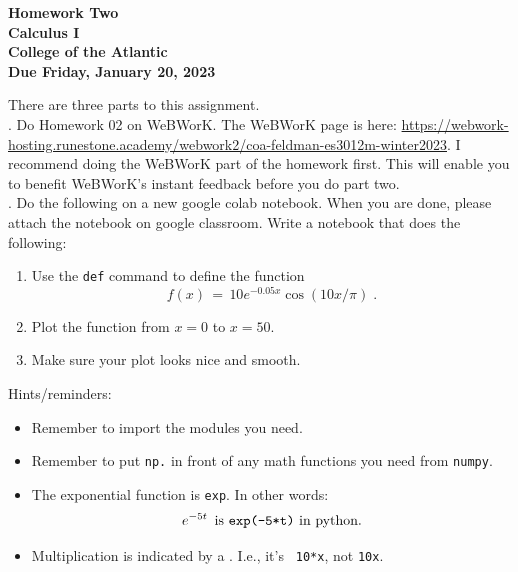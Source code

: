 \documentclass[12pt]{article}
\begin{document}
\pagestyle{empty}
 
\begin{center}
{\LARGE {\bf Homework Two}}\\
\bigskip
{\Large {\bf Calculus I}}\\
\bigskip
{\Large {\bf College of the Atlantic}}\\
\bigskip
{ {\bf Due Friday, January 20, 2023}}\\ 
\end{center}
\medskip


\noindent There are three parts to this assignment.\\

.  Do Homework 02 on WeBWorK. The WeBWorK page is here:
\url{https://webwork-hosting.runestone.academy/webwork2/coa-feldman-es3012m-winter2023}.
I recommend doing the WeBWorK part of the homework first.  This will
enable you to benefit WeBWorK's instant feedback before you do part
two.\\ 


. Do the following on a new
google colab notebook. When you are done, please attach the notebook
on google classroom. Write a notebook that does the following:
\begin{enumerate}
  \setlength{\itemsep}{-1mm}
\item Use the {\tt def} command to define the function
  \begin{equation}
    f(x) \, = \, 10e^{-0.05x}\cos(10x/\pi) \;.
  \end{equation}
\item Plot the function from $x=0$ to $x=50$.
  \item Make sure your plot looks nice and smooth.
\end{enumerate}

\noindent Hints/reminders:
\begin{itemize}
  \setlength{\itemsep}{-1mm}
\item Remember to import the modules you need.
\item Remember to put {\tt np.} in front of any math functions you
  need from {\tt numpy}.
\item The exponential function is {\tt exp}.  In other words:
  \begin{equation}
    e^{-5t} \, \text{ is {\tt exp(-5*t)} in python.}
  \end{equation}
\item Multiplication is indicated by a {\tt *}.  I.e., it's {\tt
  10*x}, not {\tt 10x}. \\
\end{itemize}
\end{document}
